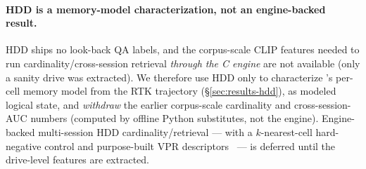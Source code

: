 \paragraph{HDD is a memory-model characterization, not an engine-backed result.}
HDD ships no look-back QA labels, and the corpus-scale CLIP features needed to run
cardinality/cross-session retrieval \emph{through the C engine} are not available
(only a sanity drive was extracted). We therefore use HDD only to characterize
\psm{}'s per-cell memory model from the RTK trajectory (\S\ref{sec:results-hdd}),
as modeled logical state, and \emph{withdraw} the earlier corpus-scale cardinality
and cross-session-AUC numbers (computed by offline Python substitutes, not the
engine). Engine-backed multi-session HDD cardinality/retrieval --- with a
$k$-nearest-cell hard-negative control and purpose-built VPR
descriptors~\cite{keetha2023anyloc,alibey2023mixvpr} --- is deferred until the
drive-level features are extracted.

